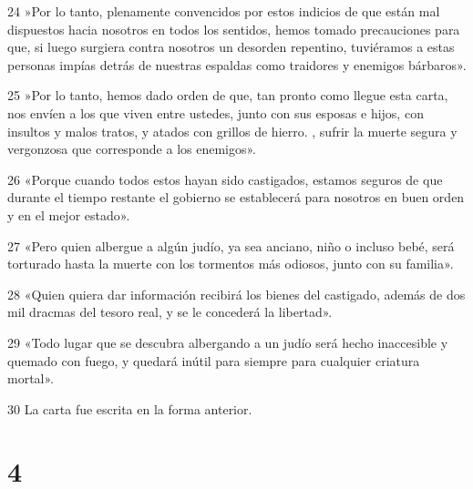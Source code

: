 \par 24 »Por lo tanto, plenamente convencidos por estos indicios de que están mal dispuestos hacia nosotros en todos los sentidos, hemos tomado precauciones para que, si luego surgiera contra nosotros un desorden repentino, tuviéramos a estas personas impías detrás de nuestras espaldas como traidores y enemigos bárbaros».
\par 25 »Por lo tanto, hemos dado orden de que, tan pronto como llegue esta carta, nos envíen a los que viven entre ustedes, junto con sus esposas e hijos, con insultos y malos tratos, y atados con grillos de hierro. , sufrir la muerte segura y vergonzosa que corresponde a los enemigos».
\par 26 «Porque cuando todos estos hayan sido castigados, estamos seguros de que durante el tiempo restante el gobierno se establecerá para nosotros en buen orden y en el mejor estado».
\par 27 «Pero quien albergue a algún judío, ya sea anciano, niño o incluso bebé, será torturado hasta la muerte con los tormentos más odiosos, junto con su familia».
\par 28 «Quien quiera dar información recibirá los bienes del castigado, además de dos mil dracmas del tesoro real, y se le concederá la libertad».
\par 29 «Todo lugar que se descubra albergando a un judío será hecho inaccesible y quemado con fuego, y quedará inútil para siempre para cualquier criatura mortal».
\par 30 La carta fue escrita en la forma anterior.

\chapter{4}

